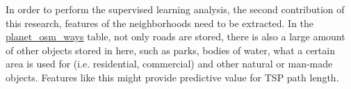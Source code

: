 In order to perform the supervised learning analysis, the second contribution of this research, features of the neighborhoods need to be extracted.
In the \url{planet_osm_ways} table, not only roads are stored, there is also a large amount of other objects stored in here, such as parks, bodies of water, what a certain area is used for (i.e. residential, commercial) and other natural or man-made objects.
Features like this might provide predictive value for TSP path length.
